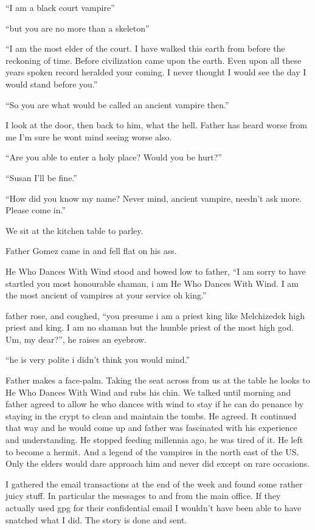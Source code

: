 ``I am a black court vampire''

``but you are no more than a skeleton''

``I am the most elder of the court. I have walked this earth from before the reckoning of time. Before civilization came upon the earth. Even upon all these years spoken record heralded your coming. I never thought I would see the day I would stand before you.''

``So you are what would be called an ancient vampire then.''

I look at the door, then back to him, what the hell. Father has heard worse from me I'm sure he wont mind seeing worse also.

``Are you able to enter a holy place? Would you be hurt?''

``Susan I'll be fine.''

``How did you know my name? Never mind, ancient vampire, needn't ask more. Please come in.''

We sit at the kitchen table to parley.

Father Gomez came in and fell flat on his ass.

He Who Dances With Wind stood and bowed low to father, ``I am sorry to have startled you most honourable shaman, i am He Who Dances With Wind. I am the most ancient of vampires at your service oh king.''

father rose, and coughed, ``you presume i am a priest king like Melchizedek high priest and king. I am no shaman but the humble priest of the most high god. Um, my dear?'', he raises an eyebrow.

``he is very polite i didn't think you would mind.''

Father makes a face-palm. Taking the seat across from us at the table he looks to He Who Dances With Wind and rubs his chin.
We talked until morning and father agreed to allow he who dances with wind to stay if he can do penance by staying in the crypt to clean and maintain the tombs. He agreed.
It continued that way and he would come up and father was fascinated with his experience and understanding. He stopped feeding millennia ago, he was tired of it. He left to become a hermit. And a legend of the vampires in the north east of the US. Only the elders would dare approach him and never did except on rare occasions.

I gathered the email transactions at the end of the week and found some rather juicy stuff. In particular the messages to and from the main office. If they actually used gpg for their confidential email I wouldn't have been able to have snatched what I did. The story is done and sent. 

